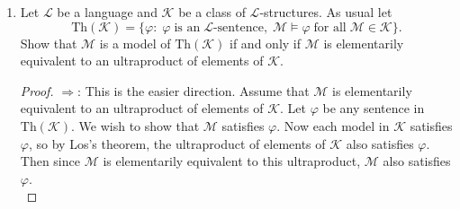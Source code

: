 \documentclass{article}
\begin{document}
\begin{enumerate}
    \begin{proof}
      Let $\alpha=\overline{\sigma}\in\mathbb{N}^*$, where
      $\sigma\in\mathbb{N}^\omega$ is defined by $\sigma(i)=i!$ for
      $i\in\omega$ (taking 0!=1).

      We show that $\alpha$ is divisible by every prime in $\mathbb{N}$.
      Given a prime $p\in\mathbb{N}$, first notice that $p$ as an element
      in $\mathcal{N}^*$ can be represented by
      $\alpha_p=\overline{\sigma_p}\in\mathcal{N}^*$, where
      $\sigma_p\in\mathbb{N}^\omega$ is defined as:
      \begin{equation*}
        \sigma_p(i) :=
        \begin{cases}
          1 & \text{if}\; i<p \\
          p & \text{if}\; i\geq p
        \end{cases}.
      \end{equation*}
      Then $\overline{\sigma_p}$ is equivalent to $\alpha_p$ in
      $\mathcal{N}^*$ because $\mathcal{U}$ contains the Frechet filter
      (since $\mathcal{U}$ is not principal, and we have proven in earlier
      homework that non-principal filters must contain the Frechet filter),
      and $\sigma_p(i)$ is only not $p$ for a finite number of $i$'s in
      $\omega$. Also, $\alpha=\overline{\sigma}$ divides
      $\alpha_p=\overline{\sigma_p}$ because $\sigma(i)$ divides
      $\sigma_p(i)$ for each $i\in\omega$. Hence $\alpha$ is a multiple of
      $\alpha_p$ for each prime $p$ in $\mathbb{N}$.
    \end{proof}

  \item Let $\mathcal{L}$ be a language and $\mathcal{K}$ be a class of
    $\mathcal{L}$-structures. As usual let
    \begin{equation*}
      \text{Th}(\mathcal{K}) = \{\varphi:\; \varphi\; \text{is an}\;
        \mathcal{L}\text{-sentence},\; \mathcal{M}\models\varphi\; \text{for
        all}\; \mathcal{M}\in\mathcal{K}\}.
    \end{equation*}
    Show that $\mathcal{M}$ is a model of $\text{Th}(\mathcal{K})$ if and
    only if $\mathcal{M}$ is elementarily equivalent to an ultraproduct of
    elements of $\mathcal{K}$.

    \begin{proof}
      $\Rightarrow$: This is the easier direction. Assume that $\mathcal{M}$
      is elementarily equivalent to an ultraproduct of elements of
      $\mathcal{K}$. Let $\varphi$ be any sentence in
      $\text{Th}(\mathcal{K})$. We wish to show that $\mathcal{M}$
      satisfies $\varphi$. Now each model in $\mathcal{K}$ satisfies
      $\varphi$, so by Los's theorem, the ultraproduct of elements of
      $\mathcal{K}$ also satisfies $\varphi$. Then since $\mathcal{M}$ is
      elementarily equivalent to this ultraproduct, $\mathcal{M}$ also
      satisfies $\varphi$. \\


\end{proof}
\end{enumerate}
\end{document}
